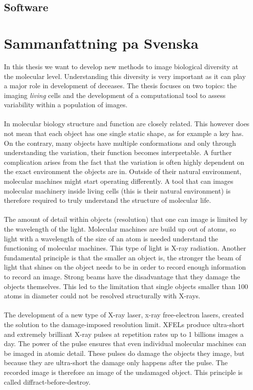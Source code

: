 \section{Software}

\chapter{Sammanfattning pa Svenska}

In this thesis we want to develop new methods to image biological diversity at the molecular level. Understanding this diversity is very important as it can play a major role in development of deceases. The thesis focuses on two topics: the imaging \textit{living} cells and the development of a computational tool to assess variability within a population of images.
\\\\
In molecular biology structure and function are closely related. This however does not mean that each object has one single static shape, as for example a key has. On the contrary, many objects have multiple conformations and only through understanding the variation, their function becomes interpretable. A further complication arises from the fact that the variation is often highly dependent on the exact environment the objects are in. Outside of their natural environment, molecular machines might start operating differently. A tool that can images molecular machinery inside living cells (this is their natural environment) is therefore required to truly understand the structure of molecular life.
\\\\
The amount of detail within objects (resolution) that one can image is limited by the wavelength of the light. Molecular machines are build up out of atoms, so light with a wavelength of the size of an atom is needed understand the functioning of molecular machines. This type of light is X-ray radiation. Another fundamental principle is that the smaller an object is, the stronger the beam of light that shines on the object needs to be in order to record enough information to record an image. Strong beams have the disadvantage that they damage the objects themselves. This led to the limitation that single objects smaller than 100 atoms in diameter could not be resolved structurally with X-rays.
\\\\
The development of a new type of X-ray laser, x-ray free-electron lasers, created the solution to the damage-imposed resolution limit. XFELs produce ultra-short and extremely brilliant X-ray pulses at repetition rates up to 1 billions images a day. The power of the pulse ensures that even individual molecular machines can be imaged in atomic detail. These pulses do damage the objects they image, but because they are ultra-short the damage only happens after the pulse. The recorded image is therefore an image of the undamaged object. This principle is called diffract-before-destroy. 
